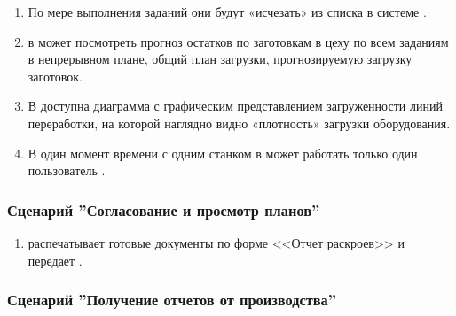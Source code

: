 \begin{enumerate}
\item	По мере выполнения заданий они будут «исчезать» из списка    в системе \gofro.
\item	\planner в  может посмотреть прогноз  остатков по заготовкам в цеху по всем заданиям в непрерывном плане, общий план загрузки, прогнозируемую загрузку заготовок.
\item	В  доступна диаграмма с графическим представлением загруженности линий переработки, на которой наглядно видно «плотность» загрузки оборудования.
\item	В один момент времени с одним станком в  может работать только один пользователь \planner.



\end{enumerate}





\subsubsection{Сценарий ''Согласование и просмотр планов''}
\label{bp:plan_5}
\begin{enumerate}




\item	\planner распечатывает готовые документы  по форме <<Отчет раскроев>> и передает \master.

\end{enumerate}


\subsubsection{Сценарий ''Получение отчетов от производства''}
\label{bp:plan_6}


